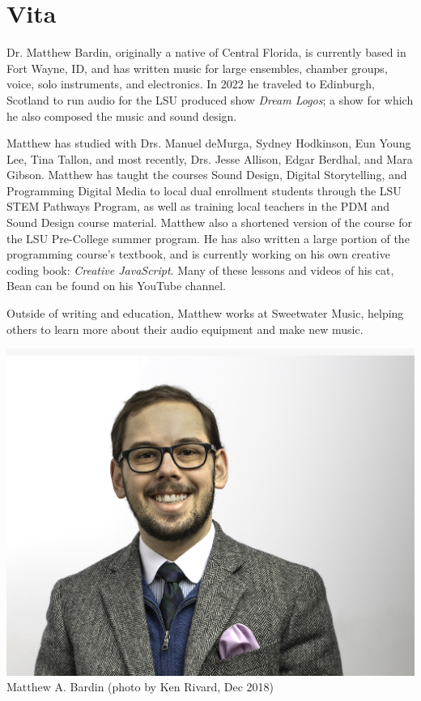 \chapter{Vita}
Dr. Matthew Bardin, originally a native of Central Florida, is currently based in Fort Wayne, ID, and has written music for large ensembles, chamber groups, voice, solo instruments, and electronics. In 2022 he traveled to Edinburgh, Scotland to run audio for the LSU produced show \textit{Dream Logos}; a show for which he also composed the music and sound design. 

Matthew has studied with Drs. Manuel deMurga, Sydney Hodkinson, Eun Young Lee, Tina Tallon, and most recently, Drs. Jesse Allison, Edgar Berdhal, and Mara Gibson. Matthew has taught the courses Sound Design, Digital Storytelling, and Programming Digital Media to local dual enrollment students through the LSU STEM Pathways Program, as well as training local teachers in the PDM and Sound Design course material. Matthew also a shortened version of the course for the LSU Pre-College summer program. He has also written a large portion of the programming course's textbook, and is currently working on his own creative coding book: \textit{Creative JavaScript}. Many of these lessons and videos of his cat, Bean can be found on his YouTube channel.

Outside of writing and education, Matthew works at Sweetwater Music, helping others to learn more about their audio equipment and make new music.


   \begin{center}
   \vspace{5mm}
       \includegraphics[scale=0.3]{Matt Bardin_web_head_4370.jpg}\\
        Matthew A. Bardin (photo by Ken Rivard, Dec 2018)
   \end{center}

